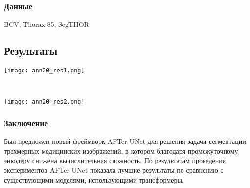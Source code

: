 \subsubsection*{Данные}
BCV, Thorax-85, SegTHOR
\subsection*{Результаты}

\begin{minipage}{1.0\linewidth}
    \begin{center}
        \texttt{[image: ann20\_res1.png]} \\
    \end{center}
    
\end{minipage}
\\
\begin{minipage}{1.0\linewidth}
    \begin{center}
        \texttt{[image: ann20\_res2.png]} \\
    \end{center}
    
\end{minipage} 

\subsubsection*{Заключение}
Был предложен новый фреймворк AFTer-UNet для решения задачи сегментации 
трехмерных медицинских изображений, в котором благодаря промежуточному энкодеру
снижена вычислительная сложность. По результатам проведения экспериментов 
AFTer-UNet показала лучшие результаты по сравнению с существующими моделями, использующими
трансформеры.